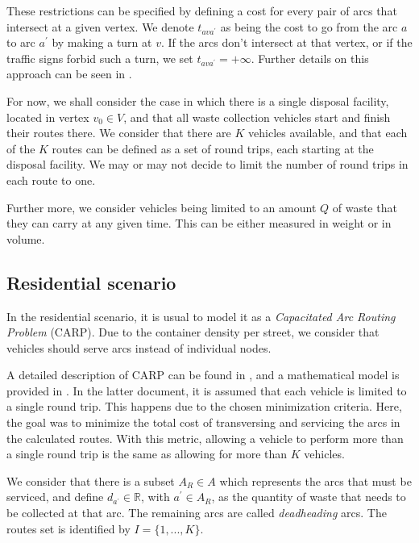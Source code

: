 These restrictions can be specified by defining a cost for every pair of arcs
that intersect at a given vertex.  We denote $t_{ava^\prime}$ as being the
cost to go from the arc $a$ to arc $a^\prime$ by making a turn at $v$. If the
arcs don't intersect at that vertex, or if the traffic signs forbid such a
turn, we set $t_{ava^\prime} = +\infty$. Further details on this approach can
be seen in \citet{Corberan2002887}.

For now, we shall consider the case in which there is a single disposal
facility, located in vertex $v_0 \in V$, and that all waste collection vehicles
start and finish their routes there. We consider that there are $K$ vehicles
available, and that each of the $K$ routes can be defined as a set of round
trips, each starting at the disposal facility. We may or may not decide to
limit the number of round trips in each route to one.

Further more, we consider vehicles being limited to an amount $Q$ of waste that
they can carry at any given time. This can be either measured in weight or in
volume.





\subsection{Residential scenario}

In the residential scenario, it is usual to model it as a \textit{Capacitated Arc
Routing Problem} (CARP). Due to the container density per street, we consider
that vehicles should serve arcs instead of individual nodes.

A detailed description of CARP can be found in \citet{Sniezek01}, and a
mathematical model is provided in \citet{Belenguer98}. In the latter document,
it is assumed that each vehicle is limited to a single round trip. This happens
due to the chosen minimization criteria. Here, the goal was to minimize the
total cost of transversing and servicing the arcs in the calculated routes.
With this metric, allowing a vehicle to perform more than a single round trip
is the same as allowing for more than $K$ vehicles.

We consider that there is a subset $A_R \in A$ which represents the arcs that
must be serviced, and define $d_{a^\prime} \in \mathbb{R}$, with $a^\prime \in
A_R$, as the quantity of waste that needs to be collected at that arc. The
remaining arcs are called \textit{deadheading} arcs. The routes set is
identified by $I = \{1, ..., K\}$.

